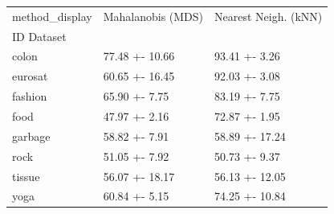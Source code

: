 \begin{tabular}{lll}
\toprule
method_display & Mahalanobis (MDS) & Nearest Neigh. (kNN) \\
ID Dataset &  &  \\
\midrule
colon & 77.48 +- 10.66 & 93.41 +- 3.26 \\
eurosat & 60.65 +- 16.45 & 92.03 +- 3.08 \\
fashion & 65.90 +- 7.75 & 83.19 +- 7.75 \\
food & 47.97 +- 2.16 & 72.87 +- 1.95 \\
garbage & 58.82 +- 7.91 & 58.89 +- 17.24 \\
rock & 51.05 +- 7.92 & 50.73 +- 9.37 \\
tissue & 56.07 +- 18.17 & 56.13 +- 12.05 \\
yoga & 60.84 +- 5.15 & 74.25 +- 10.84 \\
\bottomrule
\end{tabular}
